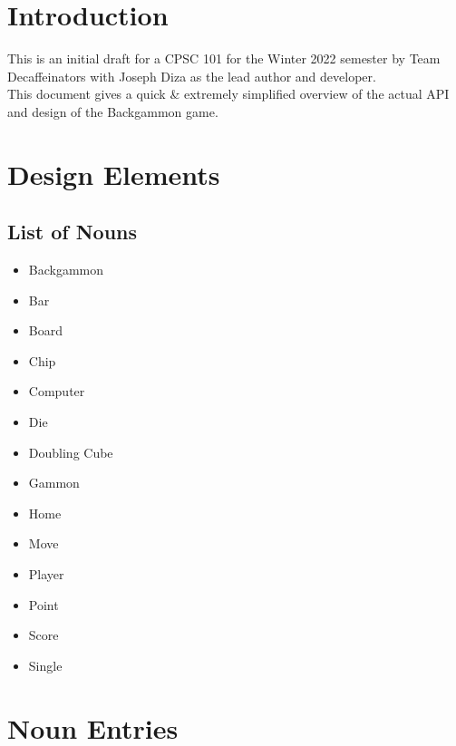 \documentclass{report}
\begin{document}

\tableofcontents

\chapter{Introduction}

This is an initial draft for a CPSC 101 for the Winter 2022 semester by Team Decaffeinators
with Joseph Diza as the lead author and developer.  \\

\noindent
This document gives a quick \& extremely simplified overview
of the actual API and design of the Backgammon game.

\chapter{Design Elements}

\section{List of Nouns}

\begin{multicols}{2}
    \begin{itemize}
        \item Backgammon
        \item Bar
        \item Board
        \item Chip
        \item Computer
        \item Die
        \item Doubling Cube
    \end{itemize}

    \begin{itemize}
        \item Gammon
        \item Home
        \item Move
        \item Player
        \item Point
        \item Score
        \item Single
    \end{itemize}
\end{multicols}

\chapter{Noun Entries}
















\end{document}
